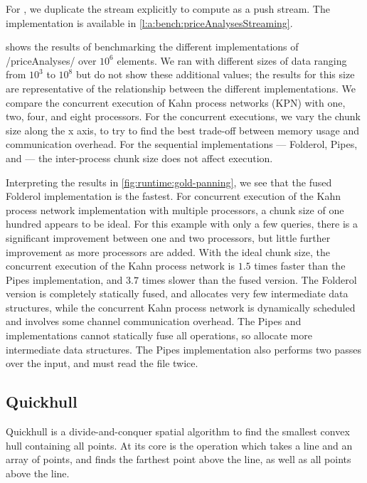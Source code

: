 For \Streaming, we duplicate the stream explicitly to compute \Hs@priceOverTime@ as a push stream.
The implementation is available in \cref{l:a:bench:priceAnalysesStreaming}.



 shows the results of benchmarking the different implementations of \Hs/priceAnalyses/ over $10^6$ elements.
We ran with different sizes of data ranging from $10^3$ to $10^8$ but do not show these additional values; the results for this size are representative of the relationship between the different implementations.
We compare the concurrent execution of Kahn process networks (KPN) with one, two, four, and eight processors.
For the concurrent executions, we vary the chunk size along the x axis, to try to find the best trade-off between memory usage and communication overhead.
For the sequential implementations --- Folderol, Pipes, and \Streaming --- the inter-process chunk size does not affect execution.

Interpreting the results in \cref{fig:runtime:gold-panning}, we see that the fused Folderol implementation is the fastest.
For concurrent execution of the Kahn process network implementation with multiple processors, a chunk size of one hundred appears to be ideal.
For this example with only a few queries, there is a significant improvement between one and two processors, but little further improvement as more processors are added.
With the ideal chunk size, the concurrent execution of the Kahn process network is $1.5$ times faster than the Pipes implementation, and $3.7$ times slower than the fused version.
The Folderol version is completely statically fused, and allocates very few intermediate data structures, while the concurrent Kahn process network is dynamically scheduled and involves some channel communication overhead.
The Pipes and \Streaming implementations cannot statically fuse all operations, so allocate more intermediate data structures.
The Pipes implementation also performs two passes over the input, and must read the file twice.

\subsection{Quickhull}

Quickhull is a divide-and-conquer spatial algorithm to find the smallest convex hull containing all points.
At its core is the \Hs@filterMax@ operation which takes a line and an array of points, and finds the farthest point above the line, as well as all points above the line.

